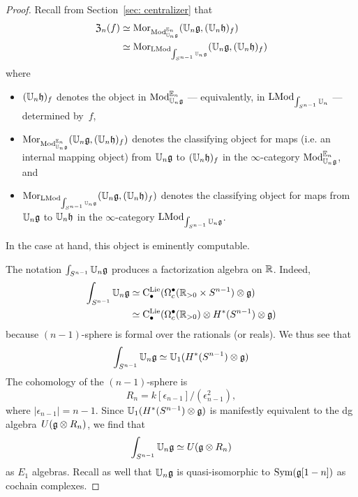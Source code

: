 \documentclass[11pt]{amsart}
\numberwithin{equation}{section}
\begin{document}
\begin{proof}
Recall from Section~\ref{sec: centralizer} that 
\begin{align*}
{\frak Z}_n(f) &\simeq {{\rm Mor}}_{{\rm Mod}^{\mathbb E_n}_{\mathbb U_n\mathfrak g}}(\mathbb U_n \mathfrak g, (\mathbb U_n \mathfrak h)_f) \\
&\simeq {\rm Mor}_{{\rm LMod}_{\int_{S^{n-1}} \mathbb U_n\mathfrak g}}(\mathbb U_n \mathfrak g, (\mathbb U_n \mathfrak h)_f)
\end{align*}
where 
\begin{itemize}
\item $(\mathbb U_n \mathfrak h)_f$ denotes the object in ${\rm Mod}^{\mathbb E_n}_{\mathbb U_n\mathfrak g}$ --- equivalently, in ${\rm LMod}_{\int_{S^{n-1}}\mathbb U_n}$ --- determined by~$f$, 
\item ${\rm Mor}_{{\rm Mod}^{\mathbb E_n}_{\mathbb U_n\mathfrak g}}(\mathbb U_n \mathfrak g, (\mathbb U_n \mathfrak h)_f)$ denotes the classifying object for maps (i.e. an internal mapping object) from $\mathbb U_n\mathfrak g$ to $(\mathbb U_n \mathfrak h)_f$ in the $\infty$-category ${\rm Mod}^{\mathbb E_n}_{\mathbb U_n\mathfrak g}$, and
\item ${\rm Mor}_{{\rm LMod}_{\int_{S^{n-1}} \mathbb U_n\mathfrak g}} (\mathbb U_n \mathfrak g, (\mathbb U_n \mathfrak h)_f)$ denotes the classifying object for maps from ${\mathbb U_n\mathfrak g}$ to $\mathbb U_n \mathfrak h$ in the $\infty$-category ${\rm LMod}_{\int_{S^{n-1}}\mathbb U_n\mathfrak g}$. 
\end{itemize}
In the case at hand, this object is eminently computable.

The notation $\int_{S^{n-1}}\mathbb U_n\mathfrak g$ produces a factorization algebra on $\mathbb R$.
Indeed,
\begin{align*}
\int_{S^{n-1}}\mathbb U_n\mathfrak g 
&\simeq {\rm C}^{\rm Lie}_\bullet(\Omega^\bullet_c(\mathbb R_{> 0} \times S^{n-1}) \otimes \mathfrak g)\\
&\simeq {\rm C}^{\rm Lie}_\bullet(\Omega^\bullet_c(\mathbb R_{> 0}) \otimes H^*(S^{n-1}) \otimes \mathfrak g)
\end{align*}
because $(n-1)$-sphere is formal over the rationals (or reals). 
We thus see that 
\[
\int_{S^{n-1}}\mathbb U_n\mathfrak g \simeq \mathbb U_1 (H^*(S^{n-1}) \otimes \mathfrak g)
\]
The cohomology of the $(n-1)$-sphere is 
\[
R_n = k[\epsilon_{n-1}]/(\epsilon_{n-1}^2),
\] 
where $|\epsilon_{n-1}| = n-1$.
Since $\mathbb U_1 (H^*(S^{n-1}) \otimes \mathfrak g)$ is manifestly equivalent to the dg algebra~$U(\mathfrak g \otimes R_n)$,
we find that 
\[
\int_{S^{n-1}}\mathbb U_n\mathfrak g \simeq U(\mathfrak g \otimes R_n)
\]
as $E_1$ algebras.
Recall as well that $\mathbb U_n \mathfrak g$ is quasi-isomorphic to ${\rm Sym}(\mathfrak g[1-n])$ as cochain complexes.


\end{proof}
\end{document}
